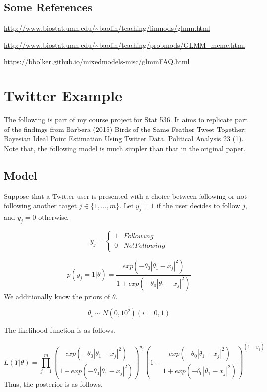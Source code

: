 \documentclass[]{book}
\begin{document}
\hypertarget{some-references}{%
\section{Some References}\label{some-references}}

\url{http://www.biostat.umn.edu/~baolin/teaching/linmods/glmm.html}

\url{http://www.biostat.umn.edu/~baolin/teaching/probmods/GLMM_mcmc.html}

\url{https://bbolker.github.io/mixedmodels-misc/glmmFAQ.html}

\hypertarget{twitter-example}{%
\chapter{Twitter Example}\label{twitter-example}}

The following is part of my course project for Stat 536. It aims to replicate part of the findings from Barbera (2015) Birds of the Same Feather Tweet Together: Bayesian Ideal Point Estimation Using Twitter Data. Political Analysis 23 (1). Note that, the following model is much simpler than that in the original paper.

\hypertarget{model}{%
\section{Model}\label{model}}

Suppose that a Twitter user is presented with a choice between following or not following another target \(j \in \{ 1, ..., m\}\). Let \(y_{j}=1\) if the user decides to follow \(j\), and \(y_{j}=0\) otherwise.

\[y_{j}=\begin{cases} 1 & Following \\ 0 & Not Following \end{cases}\]

\[p(y_{j}=1|\theta) = \frac{exp(- \theta_0|\theta_1 - x_j|^2)}{1+exp(- \theta_0|\theta_1 - x_j|^2)}\]
We additionally know the priors of \(\theta\).

\[\theta_i \sim N(0,10^2) (i = 0, 1)\]

The likelihood function is as follows.

\[L(Y|\theta)=\prod_{j=1}^{m} (\frac{exp(- \theta_0|\theta_1 - x_j|^2)}{1+exp(- \theta_0|\theta_1 - x_j|^2)})^{y_j}(1-\frac{exp(- \theta_0|\theta_1 - x_j|^2)}{1+exp(- \theta_0|\theta_1 - x_j|^2)})^{(1-y_j)}\]
Thus, the posterior is as follows.
\end{document}
